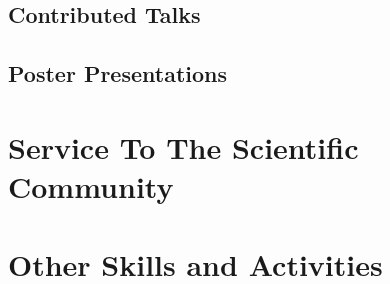 \vspace{1mm}
\subsection{Contributed Talks}


\vspace{1mm}
\subsection{Poster Presentations}


\section{Service To The Scientific Community}


\vspace{-1.5mm}
\section{Other Skills and Activities}



